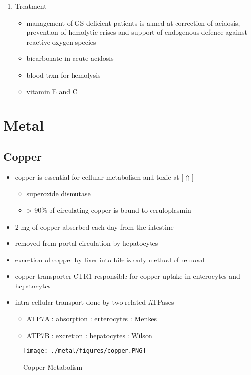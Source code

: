 \documentclass{scrartcl}
\begin{document}
\begin{enumerate}
\item Treatment
\label{sec:orgf840929}
\begin{itemize}
\item management of GS deficient patients is aimed at correction of
acidosis, prevention of hemolytic crises and support of endogenous
defence against reactive oxygen species
\item bicarbonate in acute acidosis
\item blood trxn for hemolysis
\item vitamin E and C
\end{itemize}
\end{enumerate}
\section{Metal}
\label{sec:org54816a2}
\subsection{Copper}
\label{sec:orge700bab}
\begin{itemize}
\item copper is essential for cellular metabolism and toxic at [\(\Uparrow\)]
\begin{itemize}
\item superoxide dismutase
\item > 90\% of circulating copper is bound to ceruloplasmin
\end{itemize}
\item 2 mg of copper absorbed each day from the intestine
\item removed from portal circulation by hepatocytes
\item excretion of copper by liver into bile is only method of removal
\item copper transporter CTR1 responsible for copper uptake in enterocytes and hepatocytes
\item intra-cellular transport done by two related ATPases
\begin{itemize}
\item ATP7A : absorption : enterocytes : Menkes
\item ATP7B : excretion : hepatocytes : Wilson
\end{itemize}
\end{itemize}

\begin{figure}[htbp]
\centering
\texttt{[image: ./metal/figures/copper.PNG]}
\caption[copper]{\label{fig:orgb46c842}
Copper Metabolism}
\end{figure}
\end{document}
